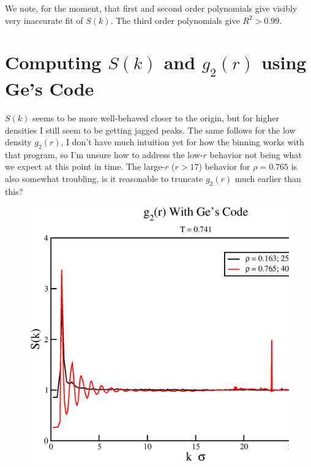 \documentclass[journal=jacsat,manuscript=article]{achemso}
\begin{document}
	We note, for the moment, that first and second order polynomials give visibly very inaccurate fit of $S(k)$. The third order polynomials give $R^2>0.99$.
	
\section{Computing $S(k)$ and $g_2(r)$ using Ge's Code}
$S(k)$ seems to be more well-behaved closer to the origin, but for higher densities I still seem to be getting jagged peaks. The same follows for the low density $g_2(r)$, I don't have much intuition yet for how the binning works with that program, so I'm unsure how to address the low-$r$ behavior not being what we expect at this point in time. The large-$r$ ($r>17$) behavior for $\rho=0.765$ is also somewhat troubling, is it reasonable to truncate $g_2(r)$ much earlier than this?

\begin{figure}[H]
    \centering
    \includegraphics[width=6.0in]{PrelimGeg2.eps}
    \caption{}
    \label{fig:my_label0}
\end{figure}
\end{document}
